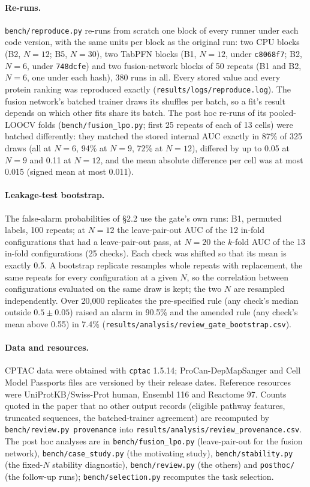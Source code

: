 \documentclass[10pt,letterpaper]{article}
\begin{document}
\paragraph{Re-runs.} \texttt{bench/reproduce.py} re-runs from scratch one block of every runner under each
code version, with the same units per block as the original run: two CPU blocks (B2, $N = 12$; B5, $N = 30$),
two TabPFN blocks (B1, $N = 12$, under \texttt{c8068f7}; B2, $N = 6$, under \texttt{748dcfe}) and two
fusion-network blocks of 50 repeats (B1 and B2, $N = 6$, one under each hash), 380 runs in all. Every stored
value and every protein ranking was reproduced exactly (\texttt{results/logs/reproduce.log}). The fusion network's batched trainer draws its shuffles per batch, so
a fit's result depends on which other fits share its batch. The post hoc re-runs of its pooled-LOOCV folds
(\texttt{bench/fusion\_lpo.py}; first 25 repeats of each of 13 cells) were batched differently: they matched
the stored internal AUC exactly in 87\% of 325 draws (all at $N = 6$, 94\% at $N = 9$, 72\% at $N = 12$),
differed by up to 0.05 at $N = 9$ and 0.11 at $N = 12$, and the mean absolute difference per cell was at most
0.015 (signed mean at most 0.011).

\paragraph{Leakage-test bootstrap.} The false-alarm probabilities of \S2.2 use the gate's own runs: B1,
permuted labels, 100 repeats; at $N = 12$ the leave-pair-out AUC of the 12 in-fold configurations that had a
leave-pair-out pass, at $N = 20$ the $k$-fold AUC of the 13 in-fold configurations (25 checks). Each check was
shifted so that its mean is exactly 0.5. A bootstrap replicate resamples whole repeats with replacement, the
same repeats for every configuration at a given $N$, so the correlation between configurations evaluated on
the same draw is kept; the two $N$ are resampled independently. Over 20,000 replicates the pre-specified rule
(any check's median outside $0.5 \pm 0.05$) raised an alarm in 90.5\% and the amended rule (any check's mean
above 0.55) in 7.4\% (\texttt{results/analysis/review\_gate\_bootstrap.csv}).

\paragraph{Data and resources.} CPTAC data were obtained with \texttt{cptac} 1.5.14; ProCan-DepMapSanger and
Cell Model Passports files are versioned by their release dates. Reference resources were UniProtKB/Swiss-Prot
human, Ensembl 116 and Reactome 97. Counts quoted in the paper that no other output records (eligible pathway
features, truncated sequences, the batched-trainer agreement) are recomputed by \texttt{bench/review.py
provenance} into \texttt{results/analysis/review\_provenance.csv}. The post hoc analyses are in
\texttt{bench/fusion\_lpo.py} (leave-pair-out for the fusion network), \texttt{bench/case\_study.py} (the
motivating study), \texttt{bench/stability.py} (the fixed-$N$ stability diagnostic), \texttt{bench/review.py}
(the others) and \texttt{posthoc/} (the follow-up runs); \texttt{bench/selection.py} recomputes the task
selection.
\end{document}
